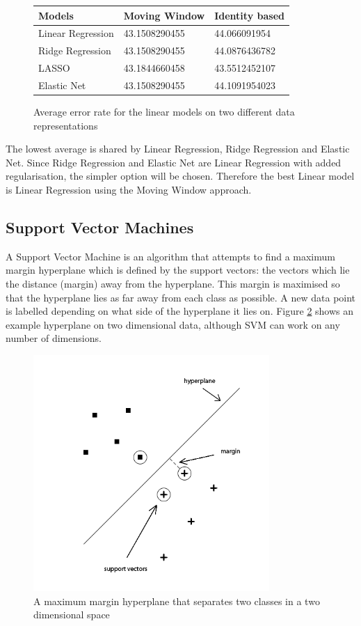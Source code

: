 \begin{figure}[h!]
\centering
\begin{tabular}{l || l | l}
Models & Moving Window & Identity based \\ \hline \hline
Linear Regression & 43.1508290455 & 44.066091954 \\ \hline
Ridge Regression & 43.1508290455 & 44.0876436782 \\ \hline
LASSO & 43.1844660458 & 43.5512452107 \\ \hline
Elastic Net & 43.1508290455 & 44.1091954023 \\ \hline
\end{tabular}
\caption{Average error rate for the linear models on two different data representations}
\label{table:linearmodelsaverages}
\end{figure}

The lowest average is shared by Linear Regression, Ridge Regression and Elastic Net. Since Ridge Regression and Elastic Net are Linear Regression with added regularisation, the simpler option will be chosen. Therefore the best Linear model is Linear Regression using the Moving Window approach.

\subsection{Support Vector Machines}
A Support Vector Machine is an algorithm that attempts to find a maximum margin hyperplane which is defined by the support vectors: the vectors which lie the distance (margin) away from the hyperplane. This margin is maximised so that the hyperplane lies as far away from each class as possible. A new data point is labelled depending on what side of the hyperplane it lies on. Figure \ref{fig:hyperplane} shows an example hyperplane on two dimensional data, although SVM can work on any number of dimensions.

\begin{figure}[h!]
\centering
\includegraphics[width=0.8\textwidth]{images/hyperplane.png}
\caption{A maximum margin hyperplane that separates two classes in a two dimensional space}
\label{fig:hyperplane}
\end{figure}

